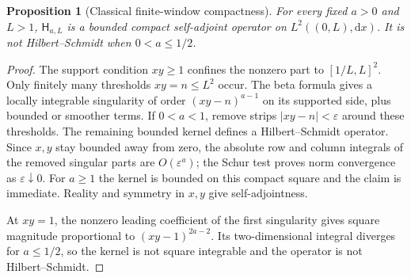 \documentclass[11pt,letterpaper]{article}
\newtheorem{proposition}[theorem]{Proposition}
\newcommand{\dd}{\mathrm d}
\begin{document}
\begin{proposition}[Classical finite-window compactness]\label{prop:compact}
For every fixed $a>0$ and $L>1$, $\mathsf H_{a,L}$ is a bounded compact self-adjoint operator on $L^2((0,L),\dd x)$. It is not Hilbert--Schmidt when $0<a\leq1/2$.
\end{proposition}
\begin{proof}
The support condition $xy\geq1$ confines the nonzero part to $[1/L,L]^2$. Only finitely many thresholds $xy=n\leq L^2$ occur. The beta formula gives a locally integrable singularity of order $(xy-n)^{a-1}$ on its supported side, plus bounded or smoother terms. If $0<a<1$, remove strips $|xy-n|<\varepsilon$ around these thresholds. The remaining bounded kernel defines a Hilbert--Schmidt operator. Since $x,y$ stay bounded away from zero, the absolute row and column integrals of the removed singular parts are $O(\varepsilon^a)$; the Schur test proves norm convergence as $\varepsilon\downarrow0$. For $a\geq1$ the kernel is bounded on this compact square and the claim is immediate. Reality and symmetry in $x,y$ give self-adjointness.

At $xy=1$, the nonzero leading coefficient of the first singularity gives square magnitude proportional to $(xy-1)^{2a-2}$. Its two-dimensional integral diverges for $a\leq1/2$, so the kernel is not square integrable and the operator is not Hilbert--Schmidt.
\end{proof}
\end{document}
